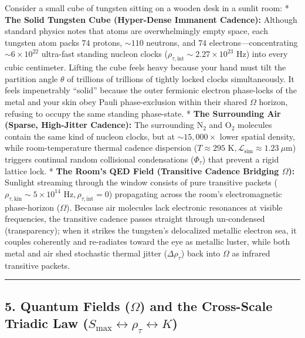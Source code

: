 \documentclass[
]{article}
\begin{document}
Consider a small cube of tungsten sitting on a wooden desk in a sunlit
room: * \textbf{The Solid Tungsten Cube (Hyper-Dense Immanent Cadence):}
Although standard physics notes that atoms are overwhelmingly empty
space, each tungsten atom packs \(74\) protons, \(\sim 110\) neutrons,
and \(74\) electrons---concentrating \(\sim 6 \times 10^{22}\)
ultra-fast standing nucleon clocks
(\(\rho_{\tau,\text{int}} \sim 2.27 \times 10^{23}\text{ Hz}\)) into
every cubic centimeter. Lifting the cube feels heavy because your hand
must tilt the partition angle \(\theta\) of trillions of trillions of
tightly locked clocks simultaneously. It feels impenetrably ``solid''
because the outer fermionic electron phase-locks of the metal and your
skin obey Pauli phase-exclusion within their shared \(\Omega\) horizon,
refusing to occupy the same standing phase-state. * \textbf{The
Surrounding Air (Sparse, High-Jitter Cadence):} The surrounding
\(\text{N}_2\) and \(\text{O}_2\) molecules contain the same kind of
nucleon clocks, but at \(\sim 15,000\times\) lower spatial density,
while room-temperature thermal cadence dispersion
(\(T \approx 295\text{ K}, \mathcal{L}_{\text{sim}} \approx 1.23\ \mu\text{m}\))
triggers continual random collisional condensations (\(\Phi_\tau\)) that
prevent a rigid lattice lock. * \textbf{The Room's QED Field (Transitive
Cadence Bridging \(\Omega\)):} Sunlight streaming through the window
consists of pure transitive packets
(\(\rho_{\tau,\text{kin}} \sim 5 \times 10^{14}\text{ Hz}, \rho_{\tau,\text{int}} = 0\))
propagating across the room's electromagnetic phase-horizon
(\(\Omega\)). Because air molecules lack electronic resonances at
visible frequencies, the transitive cadence passes straight through
un-condensed (transparency); when it strikes the tungsten's delocalized
metallic electron sea, it couples coherently and re-radiates toward the
eye as metallic luster, while both metal and air shed stochastic thermal
jitter (\(\Delta\rho_\tau\)) back into \(\Omega\) as infrared transitive
packets.

\begin{center}\rule{0.5\linewidth}{0.5pt}\end{center}

\subsection{\texorpdfstring{5. Quantum Fields (\(\Omega\)) and the
Cross-Scale Triadic Law
(\(S_{\text{max}} \leftrightarrow \rho_\tau \leftrightarrow K\))}{5. Quantum Fields (\textbackslash Omega) and the Cross-Scale Triadic Law (S\_\{\textbackslash text\{max\}\} \textbackslash leftrightarrow \textbackslash rho\_\textbackslash tau \textbackslash leftrightarrow K)}}\label{quantum-fields-omega-and-the-cross-scale-triadic-law-s_textmax-leftrightarrow-rho_tau-leftrightarrow-k}
\end{document}
